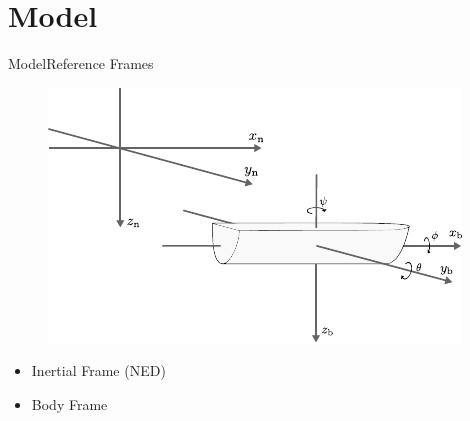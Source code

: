 \section{Model}

\begin{frame}{Model}{Reference Frames}
    \begin{figure}[H]
        \centering
        \includegraphics[width=0.7\linewidth]{figures/boat3D}
    \end{figure}
    \begin{itemize}
        \item Inertial Frame (NED)
        \item Body Frame
    \end{itemize}
\end{frame}

